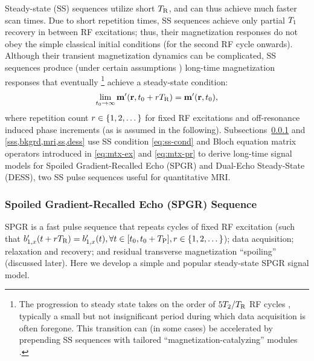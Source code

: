 Steady-state (SS) sequences
\cite{hinshaw:76:ifb}
utilize short $T_\mathrm{R}$,
and can thus achieve much faster scan times.
Due to short repetition times,
SS sequences achieve only partial $T_1$ recovery
in between RF excitations;
thus, their magnetization responses
do not obey the simple classical initial conditions
(for the second RF cycle onwards).
Although their transient magnetization dynamics
can be complicated,
SS sequences produce
(under certain assumptions \cite{scheffler:99:apd})
long-time magnetization responses
that eventually
\footnote{The progression to steady state takes 
	on the order of 
	$5T_2/T_\mathrm{R}$ RF cycles \cite{scheffler:99:apd},
	typically a small but not insignificant period 
	during which data acquisition is often foregone. 
	This transition can
	(in some cases) be accelerated 
	by prepending SS sequences
	with tailored ``magnetization-catalyzing'' modules
	\cite{hargreaves:01:car}.
}
achieve a
steady-state condition:
\begin{align}
	\lim_{t_0 \to \infty} \bmmp\paren{\bmr,t_0+\rep\TR} = \bmmp\paren{\bmr,t_0},
	\label{eq:ss-cond}
\end{align}
where repetition count 
$\rep \in \set{1,2,\dots}$
for fixed RF excitations
and off-resonance induced phase increments
(as is assumed in the following).
Subsections~\ref{sss,bkgrd,mri,ss,spgr}
and \ref{sss,bkgrd,mri,ss,dess}
use SS condition \eqref{eq:ss-cond}
and Bloch equation matrix operators
introduced in
\eqref{eq:mtx-ex} and \eqref{eq:mtx-pr}
to derive long-time signal models
for Spoiled Gradient-Recalled Echo (SPGR)
and Dual-Echo Steady-State (DESS),
two SS pulse sequences
useful for quantitative MRI.

\subsubsection{Spoiled Gradient-Recalled Echo (SPGR) Sequence}
\label{sss,bkgrd,mri,ss,spgr}

SPGR \cite{zur:91:sot}
is a fast pulse sequence
that repeats cycles of 
fixed RF excitation
(such that $\bonexp\paren{t+\rep\TR} = \bonexp\pt,
\forall t\in\brac{t_0,t_0+\TP}, r\in\set{1,2,\dots}$);
data acquisition;
relaxation and recovery;
and residual transverse magnetization ``spoiling''
(discussed later).
Here we develop
a simple and popular steady-state SPGR signal model.

